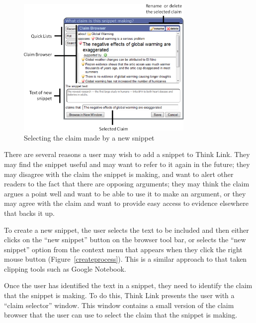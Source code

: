 \documentclass{chi2009}
\begin{document}

\begin{figure}[tb]
	\includegraphics[width=8.5cm]{../screenshots/snipsave_diagram_full.png}
	\caption{Selecting the claim made by a new snippet}
	\label{snipsavecrop}
\end{figure}

There are several reasons a user may wish to add a snippet to Think Link. They may find the snippet useful and may want to refer to it again in the future; they may disagree with the claim the snippet is making, and want to alert other readers to the fact that there are opposing arguments; they may think the claim argues a point well and want to be able to use it to make an argument, or they may agree with the claim and want to provide easy access to evidence elsewhere that backs it up. 

To create a new snippet, the user selects the text to be included and then either clicks on the ``new snippet'' button on the browser tool bar, or selects the ``new snippet'' option from the context menu that appears when they click the right mouse button (Figure~\ref{createprocess}). This is a similar approach to that taken clipping tools such as Google Notebook.

Once the user has identified the text in a snippet, they need to identify the claim that the snippet is making. To do this, Think Link presents the user with a ``claim selector'' window. This window contains a small version of the claim browser that the user can use to select the claim that the snippet is making. 
\end{document}
